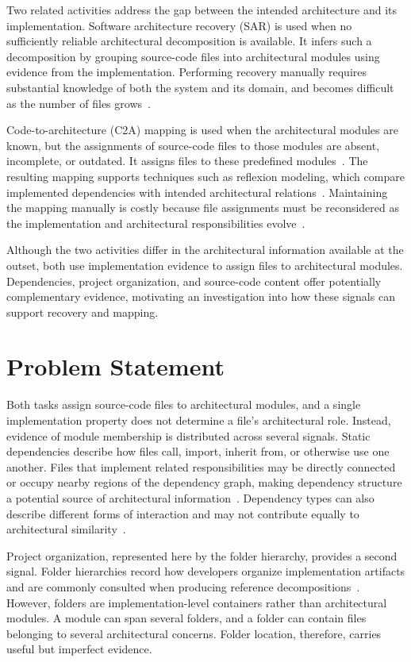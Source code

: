 Two related activities address the gap between the intended architecture and its implementation. Software architecture recovery (SAR) is used when no sufficiently reliable architectural decomposition is available. It infers such a decomposition by grouping source-code files into architectural modules using evidence from the implementation. Performing recovery manually requires substantial knowledge of both the system and its domain, and becomes difficult as the number of files grows~\cite{garcia2013}.

Code-to-architecture (C2A) mapping is used when the architectural modules are known, but the assignments of source-code files to those modules are absent, incomplete, or outdated. It assigns files to these predefined modules~\cite{tzerpos1997orphan,christl2007automated}. The resulting mapping supports techniques such as reflexion modeling, which compare implemented dependencies with intended architectural relations~\cite{reflexion1}. Maintaining the mapping manually is costly because file assignments must be reconsidered as the implementation and architectural responsibilities evolve~\cite{ali2018architecture}.

Although the two activities differ in the architectural information available at the outset, both use implementation evidence to assign files to architectural modules. Dependencies, project organization, and source-code content offer potentially complementary evidence, motivating an investigation into how these signals can support recovery and mapping.

\section{Problem Statement}
\label{sec:intro-problem}

Both tasks assign source-code files to architectural modules, and a single implementation property does not determine a file's architectural role. Instead, evidence of module membership is distributed across several signals. Static dependencies describe how files call, import, inherit from, or otherwise use one another. Files that implement related responsibilities may be directly connected or occupy nearby regions of the dependency graph, making dependency structure a potential source of architectural information~\cite{negar}. Dependency types can also describe different forms of interaction and may not contribute equally to architectural similarity~\cite{edge_weights}.

Project organization, represented here by the folder hierarchy, provides a second signal. Folder hierarchies record how developers organize implementation artifacts and are commonly consulted when producing reference decompositions~\cite{garcia2013}. However, folders are implementation-level containers rather than architectural modules. A module can span several folders, and a folder can contain files belonging to several architectural concerns. Folder location, therefore, carries useful but imperfect evidence.

